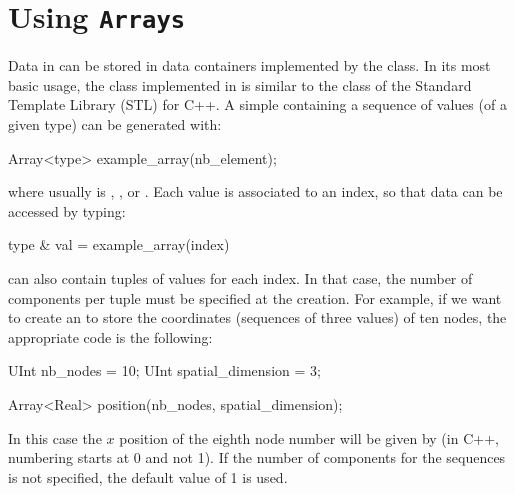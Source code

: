 

\section{Using \texttt{Arrays}}

Data in \akantu can be stored in data containers implemented by
the  class. In its most basic usage, the  class
implemented in \akantu is similar to the  class of
the Standard Template Library (STL) for C++. A simple 
containing a sequence of  values (of a given type) can be generated with:
\begin{cpp}
  Array<type> example_array(nb_element);
\end{cpp}
where  usually is , ,  or
. Each value is associated to an index, so that data can be
accessed by typing:

\begin{cpp}
  type & val = example_array(index)
\end{cpp}

 can also contain tuples of values for each index. In
that case, the number of components per tuple must be specified at the
 creation.  For example, if we want to create an
 to store the coordinates (sequences of three values) of
ten nodes, the appropriate code is the following:
\begin{cpp}
  UInt nb_nodes = 10;
  UInt spatial_dimension = 3;

  Array<Real> position(nb_nodes, spatial_dimension);
\end{cpp}
In this case the $x$ position of the eighth node number will be given by
 (in C++, numbering starts at 0 and not
1). If the number of components for the sequences is not specified, the
default value of 1 is used.

